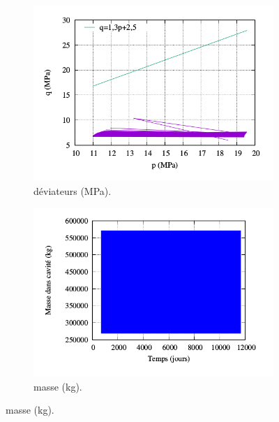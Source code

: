 \documentclass[11pt,french,a4paper]{article}
\begin{document}
\begin{figure}[h!]
    \begin{subfigure}[b]{0.42\linewidth}
        \includegraphics[width=\linewidth]{image/annexe/cav_sal/P2M_bon/q(t).png}
        \caption{déviateurs (MPa).}
    \end{subfigure}
    \begin{subfigure}[b]{0.42\linewidth}
        \includegraphics[width=\linewidth]{image/annexe/cav_sal/P2M_bon/M.png}
        \caption{masse (kg).}
    \end{subfigure}
    

\end{figure}
\end{document}
